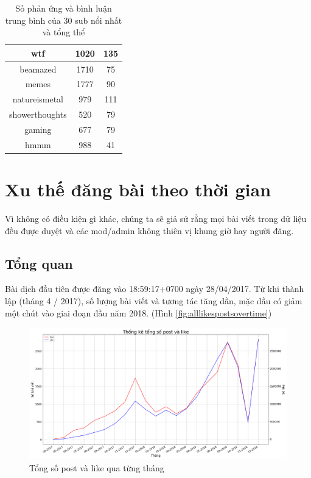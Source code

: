 \documentclass[10pt,a4paper]{article}
\begin{document}
\begin{table}[hp]
\begin{tabular}{|c|c|c|}
        \hline
        wtf & 1020 & 135 \\
        \hline
        beamazed & 1710 & 75 \\
        \hline
        memes & 1777 & 90 \\
        \hline
        natureismetal & 979 & 111 \\
        \hline
        showerthoughts & 520 & 79 \\
        \hline
        gaming & 677 & 79 \\
        \hline
        hmmm & 988 & 41 \\
        \hline
    \end{tabular} 
    \caption{Số phản ứng và bình luận trung bình của 30 sub nổi nhất và tổng thể}
    \label{tab:meaninterests}   
\end{table}

\section{Xu thế đăng bài theo thời gian}
Vì không có điều kiện gì khác, chúng ta sẽ giả sử rằng mọi bài viết trong dữ liệu đều được duyệt và các mod/admin không thiên vị khung giờ hay người đăng.

\subsection{Tổng quan}

Bài dịch đầu tiên được đăng vào 18:59:17+0700 ngày 28/04/2017. Từ khi thành lập (tháng 4 / 2017), số lượng bài viết và tương tác tăng dần, mặc dầu có giảm một chút vào giai đoạn đầu năm 2018. (Hình \eqref{fig:alllikespostsovertime})
\begin{figure}[!h]
    \centering
    \includegraphics[width=\textwidth]{img/AllLikesPostsOverTime.png}
    \caption{Tổng số post và like qua từng tháng}
    \label{fig:alllikespostsovertime}
\end{figure}
\end{document}
